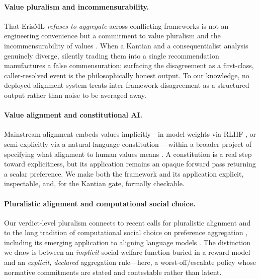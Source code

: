\paragraph{Value pluralism and incommensurability.}
That ErisML \emph{refuses to aggregate} across conflicting frameworks is not an engineering
convenience but a commitment to value pluralism and the incommensurability of values
\citep{berlin1969,williams1981,chang1997}. When a Kantian and a consequentialist analysis
genuinely diverge, silently trading them into a single recommendation manufactures a false
commensuration; surfacing the disagreement as a first-class, caller-resolved event is the
philosophically honest output. To our knowledge, no deployed alignment system treats
inter-framework disagreement as a structured output rather than noise to be averaged away.

\paragraph{Value alignment and constitutional AI.}
Mainstream alignment embeds values implicitly---in model weights via RLHF
\citep{christiano2017}, or semi-explicitly via a natural-language constitution
\citep{bai2022constitutional}---within a broader project of specifying what alignment to
human values means \citep{gabriel2020}. A constitution is a real step toward explicitness,
but its application remains an opaque forward pass returning a scalar preference. We make
both the framework and its application explicit, inspectable, and, for the Kantian gate,
formally checkable.

\paragraph{Pluralistic alignment and computational social choice.}
Our verdict-level pluralism connects to recent calls for pluralistic alignment
\citep{sorensen2024} and to the long tradition of computational social choice on preference
aggregation \citep{brandt2016}, including its emerging application to aligning language
models \citep{conitzer2024}. The distinction we draw is between an \emph{implicit}
social-welfare function buried in a reward model and an \emph{explicit, declared}
aggregation rule---here, a worst-off/escalate policy whose normative commitments are stated
and contestable rather than latent.

